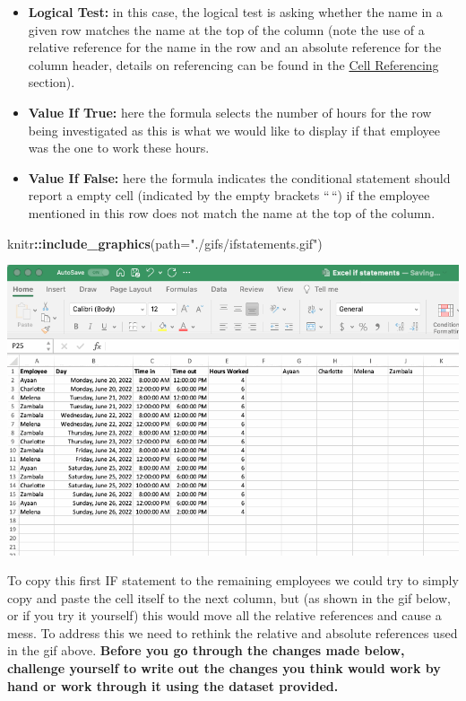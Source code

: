 \documentclass[
]{book}
\newenvironment{Shaded}{\begin{snugshade}}{\end{snugshade}}
\newcommand{\AttributeTok}[1]{\textcolor[rgb]{0.13,0.29,0.53}{#1}}
\newcommand{\FunctionTok}[1]{\textcolor[rgb]{0.13,0.29,0.53}{\textbf{#1}}}
\newcommand{\NormalTok}[1]{#1}
\newcommand{\SpecialCharTok}[1]{\textcolor[rgb]{0.81,0.36,0.00}{\textbf{#1}}}
\newcommand{\StringTok}[1]{\textcolor[rgb]{0.31,0.60,0.02}{#1}}
\begin{document}
\begin{itemize}
\item
  \textbf{Logical Test:} in this case, the logical test is asking whether the name in a given row matches the name at the top of the column (note the use of a relative reference for the name in the row and an absolute reference for the column header, details on referencing can be found in the \protect\hyperlink{cell-referencing}{Cell Referencing} section).
\item
  \textbf{Value If True:} here the formula selects the number of hours for the row being investigated as this is what we would like to display if that employee was the one to work these hours.
\item
  \textbf{Value If False:} here the formula indicates the conditional statement should report a empty cell (indicated by the empty brackets ``\,``) if the employee mentioned in this row does not match the name at the top of the column.
\end{itemize}

\begin{Shaded}
\begin{Highlighting}[]
\NormalTok{knitr}\SpecialCharTok{::}\FunctionTok{include\_graphics}\NormalTok{(}\AttributeTok{path=}\StringTok{"./gifs/ifstatements.gif"}\NormalTok{)}
\end{Highlighting}
\end{Shaded}

\includegraphics{./gifs/ifstatements.gif}

To copy this first IF statement to the remaining employees we could try to simply copy and paste the cell itself to the next column, but (as shown in the gif below, or if you try it yourself) this would move all the relative references and cause a mess. To address this we need to rethink the relative and absolute references used in the gif above. \textbf{Before you go through the changes made below, challenge yourself to write out the changes you think would work by hand or work through it using the dataset provided.}
\end{document}
